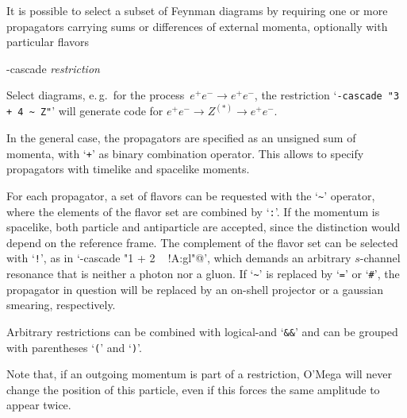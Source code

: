 \documentclass[12pt,a4paper]{article}
\newenvironment{options}%
 {\begin{list}{}%
   {\setlength{\leftmargin}{3em}%
    \setlength{\rightmargin}{3em}%
    \setlength{\itemindent}{1em}%
    \setlength{\listparindent}{0pt}%
    \settowidth{\labelwidth}{5em}%
    \renewcommand{\makelabel}[1]{\texttt{##1}}}}%
 {\end{list}}
\begin{document}
It is possible to select a subset of Feynman diagrams by requiring one
or more propagators carrying sums or differences of external momenta,
optionally with particular flavors
\begin{options}
  \item[-cascade] \textit{restriction}\par
    Select diagrams, e.\,g.~for the process~$e^+e^-\to
    e^+e^-$, the restriction `\verb:-cascade "3 + 4 ~ Z":' will
    generate code for $e^+ e^- \to Z^{(*)} \to e^+ e^-$.

    In the general case, the propagators are specified as an unsigned
    sum of momenta, with `\verb-+-' as binary combination operator.
    This allows to specify propagators with timelike and spacelike
    moments.

    For each propagator, a set of flavors can be requested with the
    `\verb+~+' operator, where the elements of the flavor set are
    combined by `\verb+:+'.
    If the momentum is spacelike, both particle and antiparticle are
    accepted, since the distinction would depend on the reference
    frame.
    The complement of the flavor set can be selected with `\verb+!+',
    as in `\verb@-cascade "1 + 2 ~ !A:gl"@', which demands an
    arbitrary $s$-channel resonance that is neither a photon nor a
    gluon.
    If `\verb+~+' is replaced by `\verb+=+' or `\verb+#+', the
    propagator in question will be replaced by an on-shell projector
    or a gaussian smearing, respectively.

    Arbitrary restrictions can be combined with logical-and
    `\verb+&&+' and can be grouped with parentheses `\verb+(+' and
    `\verb+)+'.

    Note that, if an outgoing momentum is part of a restriction, O'Mega will
    never change the position of this particle, even if this forces
    the same amplitude to appear twice.
\end{options}
\end{document}
